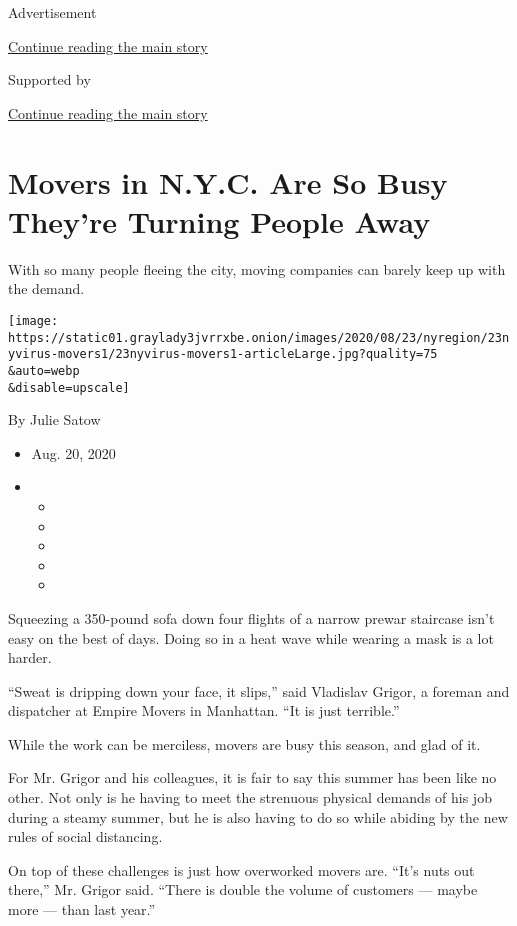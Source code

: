 Advertisement

\protect\hyperlink{after-top}{Continue reading the main story}

Supported by

\protect\hyperlink{after-sponsor}{Continue reading the main story}

\hypertarget{movers-in-nyc-are-so-busy-theyre-turning-people-away}{%
\section{Movers in N.Y.C. Are So Busy They're Turning People
Away}\label{movers-in-nyc-are-so-busy-theyre-turning-people-away}}

With so many people fleeing the city, moving companies can barely keep
up with the demand.

\texttt{[image: https://static01.graylady3jvrrxbe.onion/images/2020/08/23/nyregion/23nyvirus-movers1/23nyvirus-movers1-articleLarge.jpg?quality=75\\\&auto=webp\\\&disable=upscale]}

By Julie Satow

\begin{itemize}
\item
  Aug. 20, 2020
\item
  \begin{itemize}
  \item
  \item
  \item
  \item
  \item
  \end{itemize}
\end{itemize}

Squeezing a 350-pound sofa down four flights of a narrow prewar
staircase isn't easy on the best of days. Doing so in a heat wave while
wearing a mask is a lot harder.

``Sweat is dripping down your face, it slips,'' said Vladislav Grigor, a
foreman and dispatcher at Empire Movers in Manhattan. ``It is just
terrible.''

While the work can be merciless, movers are busy this season, and glad
of it.

For Mr. Grigor and his colleagues, it is fair to say this summer has
been like no other. Not only is he having to meet the strenuous physical
demands of his job during a steamy summer, but he is also having to do
so while abiding by the new rules of social distancing.

On top of these challenges is just how overworked movers are. ``It's
nuts out there,'' Mr. Grigor said. ``There is double the volume of
customers --- maybe more --- than last year.''

